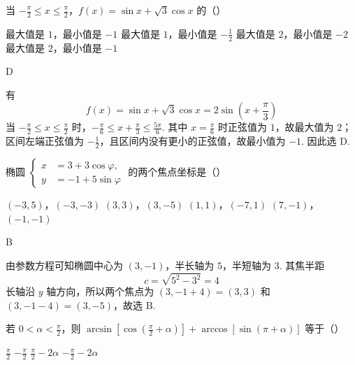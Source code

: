 \documentclass[UTF8,a4paper,oneside,11pt]{ctexbook}
\begin{document}
\begin{problem}
当 \(-\frac{\pi}{2} \leqslant x \leqslant \frac{\pi}{2}\)，\(f(x) = \sin x + \sqrt{3} \cos x\) 的（\quad）

\choices
    {最大值是 \(1\)，最小值是 \(-1\)}
    {最大值是 \(1\)，最小值是 \(-\frac{1}{2} \)}
    {最大值是 \(2\)，最小值是 \(-2\)}
    {最大值是 \(2\)，最小值是 \(-1\)}
\end{problem}

\begin{answer}
D
\end{answer}

\begin{solution}
有
\[
f(x)=\sin x+\sqrt3\cos x=2\sin\left(x+\frac{\pi}{3}\right)
\]
当 \(-\frac{\pi}{2}\leqslant x\leqslant\frac{\pi}{2}\) 时，\(-\frac{\pi}{6}\leqslant x+\frac{\pi}{3}\leqslant\frac{5\pi}{6}\). 其中 \(x=\frac{\pi}{6}\) 时正弦值为 \(1\)，故最大值为 \(2\)；区间左端正弦值为 \(-\frac12\)，且区间内没有更小的正弦值，故最小值为 \(-1\). 因此选 D.
\end{solution}

\begin{problem}
椭圆 \(\begin{cases}
x &= 3 + 3\cos\varphi,\\
y &= -1 + 5\sin\varphi
\end{cases}\) 的两个焦点坐标是（\quad）

\choices
    {\((-3,5)\)，\((-3,-3)\)}
    {\((3,3)\)，\((3,-5)\)}
    {\((1,1)\)，\((-7,1)\)}
    {\((7,-1)\)，\((-1,-1)\)}
\end{problem}

\begin{answer}
B
\end{answer}

\begin{solution}
由参数方程可知椭圆中心为 \((3,-1)\)，半长轴为 \(5\)，半短轴为 \(3\). 其焦半距
\[
c=\sqrt{5^2-3^2}=4
\]
长轴沿 \(y\) 轴方向，所以两个焦点为 \((3,-1+4)=(3,3)\) 和 \((3,-1-4)=(3,-5)\)，故选 B.
\end{solution}

\begin{problem}
若 \(0 < \alpha < \frac{\pi}{2}\)，则 \(\arcsin \left[\cos \left(\frac{\pi}{2} + \alpha\right)\right] + \arccos \left[\sin (\pi + \alpha)\right]\) 等于（\quad）

\choices
    {\(\frac{\pi}{2} \)}
    {\(-\frac{\pi}{2} \)}
    {\(\frac{\pi}{2}-2\alpha \)}
    {\(-\frac{\pi}{2}-2\alpha \)}
\end{problem}
\end{document}
